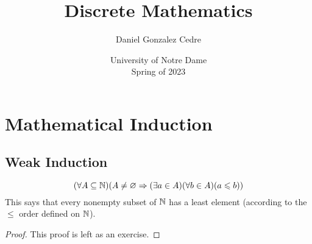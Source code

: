 







\title{Discrete Mathematics}
\author{Daniel Gonzalez Cedre}
\date{University of Notre Dame \\ Spring of 2023}
\maketitle

\setcounter{chapter}{3}
\chapter{Mathematical Induction}

\section{Weak Induction}

\begin{theorem}\label{thm:lep}
    \vspace{-\parskip}
    \[
        \pn*{\forall A \subseteq \N}\pn*{A \neq \emptyset \implies \pn*{\exists a \in A}\pn*{\forall b \in A}\pn*{a \leq b}}
    \]
    This says that every nonempty subset of \(\mathbb{N}\) has a least element
    (according to the \(\leq\) order defined on \(\mathbb{N}\)).
\end{theorem}
\begin{proof}
    This proof is left as an exercise.
\end{proof}

